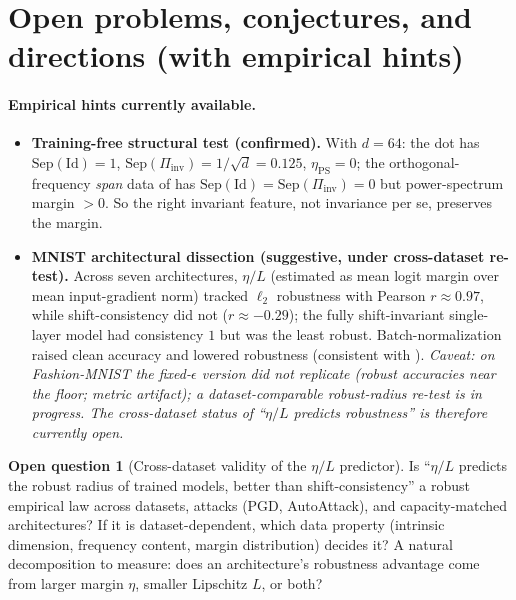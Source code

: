 \documentclass[11pt]{article}
\theoremstyle{plain}
\theoremstyle{definition}
\newtheorem{question}{Open question}
\theoremstyle{remark}
\newcommand{\Sep}{\mathrm{Sep}}
\newcommand{\Piinv}{\Pi_{\mathrm{inv}}}
\begin{document}
\section{Open problems, conjectures, and directions (with empirical hints)}\label{sec:open}

\paragraph{Empirical hints currently available.}
\begin{itemize}[leftmargin=1.4em,topsep=2pt,itemsep=1pt]
\item \textbf{Training-free structural test (confirmed).} With $d=64$: the dot has $\Sep(\mathrm{Id})=1$, $\Sep(\Piinv)=1/\sqrt d=0.125$, $\eta_{\mathrm{PS}}=0$; the orthogonal-frequency \emph{span} data of \citet{ge2021shift} has $\Sep(\mathrm{Id})=\Sep(\Piinv)=0$ but power-spectrum margin $>0$. So the right invariant feature, not invariance per se, preserves the margin.
\item \textbf{MNIST architectural dissection (suggestive, under cross-dataset re-test).} Across seven architectures, $\eta/L$ (estimated as mean logit margin over mean input-gradient norm) tracked $\ell_2$ robustness with Pearson $r\approx0.97$, while shift-consistency did not ($r\approx-0.29$); the fully shift-invariant single-layer model had consistency $1$ but was the least robust. Batch-normalization raised clean accuracy and lowered robustness (consistent with \citet{galloway2019batchnorm}). \emph{Caveat: on Fashion-MNIST the fixed-$\epsilon$ version did not replicate (robust accuracies near the floor; metric artifact); a dataset-comparable robust-radius re-test is in progress. The cross-dataset status of ``$\eta/L$ predicts robustness'' is therefore currently open.}
\end{itemize}

\begin{question}[Cross-dataset validity of the $\eta/L$ predictor]\label{q:etaL}
Is ``$\eta/L$ predicts the robust radius of trained models, better than shift-consistency'' a robust empirical law across datasets, attacks (PGD, AutoAttack), and capacity-matched architectures? If it is dataset-dependent, which data property (intrinsic dimension, frequency content, margin distribution) decides it? A natural decomposition to measure: does an architecture's robustness advantage come from larger margin $\eta$, smaller Lipschitz $L$, or both?
\end{question}
\end{document}
